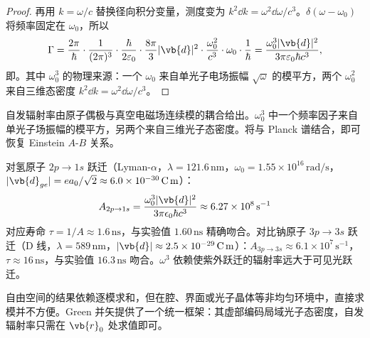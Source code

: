 \begin{proof}
再用 $k=\omega/c$ 替换径向积分变量，测度变为 $k^2\dd k=\omega^2\dd\omega/c^3$。$\delta(\omega-\omega_0)$ 将频率固定在 $\omega_0$，所以
\begin{equation}
\label{eq:spontaneous-emission-rate}
\Gamma=\frac{2\pi}{\hbar}\cdot\frac{1}{(2\pi)^3}\cdot\frac{\hbar}{2\varepsilon_0}\cdot\frac{8\pi}{3}|\vb{d}|^2\cdot\frac{\omega_0^2}{c^3}\cdot\omega_0\cdot\frac{1}{\hbar}
=\frac{\omega_0^3|\vb{d}|^2}{3\pi\varepsilon_0\hbar c^3},
\end{equation}
即。其中 $\omega_0^3$ 的物理来源：一个 $\omega_0$ 来自单光子电场振幅 $\sqrt{\omega}$ 的模平方，两个 $\omega_0^2$ 来自三维态密度 $k^2\dd k=\omega^2\dd\omega/c^3$。
\end{proof}

自发辐射率由原子偶极与真空电磁场连续模的耦合给出。\(\omega_0^3\) 中一个频率因子来自单光子场振幅的模平方，另两个来自三维光子态密度。将与 Planck 谱结合，即可恢复 Einstein \(A\)-\(B\) 关系。

 对氢原子 \(2p\to1s\) 跃迁（Lyman-\(\alpha\)，\(\lambda=121.6\,\mathrm{nm}\)，\(\omega_0=1.55\times10^{16}\,\mathrm{rad/s}\)，\(|\vb{d}_{ge}|=ea_0/\sqrt{2}\approx6.0\times10^{-30}\,\mathrm{C\,m}\)）：
\[
A_{2p\to1s}
=\frac{\omega_0^3|\vb{d}|^2}{3\pi\epsilon_0\hbar c^3}
\approx6.27\times10^8\,\mathrm{s^{-1}}
\]
对应寿命 \(\tau=1/A\approx1.6\,\mathrm{ns}\)，与实验值 \(1.60\,\mathrm{ns}\) 精确吻合。对比钠原子 \(3p\to3s\) 跃迁（D 线，\(\lambda=589\,\mathrm{nm}\)，\(|\vb{d}|\approx2.5\times10^{-29}\,\mathrm{C\,m}\)）：\(A_{3p\to3s}\approx6.1\times10^7\,\mathrm{s^{-1}}\)，\(\tau\approx16\,\mathrm{ns}\)，与实验值 \(16.3\,\mathrm{ns}\) 吻合。\(\omega^3\) 依赖使紫外跃迁的辐射率远大于可见光跃迁。

自由空间的结果依赖逐模求和，但在腔、界面或光子晶体等非均匀环境中，直接求模并不方便。Green 并矢提供了一个统一框架：其虚部编码局域光子态密度，自发辐射率只需在 $\vb{r}_0$ 处求值即可。

